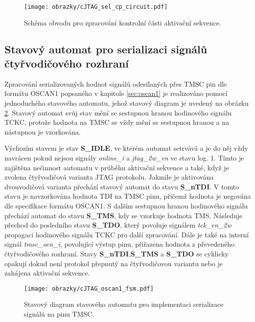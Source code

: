 \begin{figure}[!h]
  \begin{center}
    \texttt{[image: obrazky/cJTAG\_sel\_cp\_circuit.pdf]}
  \end{center}
  \caption{Schéma obvodu pro zpracování kontrolní části aktivační sekvence.}
	\label{fig:cJTAG_sel_cp_circuit}
\end{figure}

\subsection{Stavový automat pro serializaci signálů čtyřvodičového rozhraní}	\label{subsec:oscan1_fsm}
Zpracování serializovaných hodnot signálů odesílaných přes TMSC pin dle formátu OSCAN1 popsaného v kapitole \ref{sec:oscan1} je realizováno pomocí jednoduchého stavového automatu, jehož stavový diagram je uvedený na obrázku \ref{fig:cJTAG_oscan1_fsm}. Stavový automat svůj stav mění se sestupnou hranou hodinového signálu TCKC, protože hodnota na TMSC se vždy mění se sestupnou hranou a na nástupnou je vzorkována.

Výchozím stavem je stav \textbf{S\_IDLE}, ve kterém automat setrvává a je do něj vždy navrácen pokud nejsou signály \textit{online\_i} a \textit{jtag\_2w\_en} ve stavu log. 1. Tímto je zajištěna nečinnost automatu v průběhu aktivační sekvence a také, když je zvolena čtyřvodičová varianta \acs{JTAG} protokolu. Jakmile je aktivována dvouvodičová varianta přechází stavový automat do stavu \textbf{S\_nTDI}. V tomto stavu je navzorkována hodnota TDI na TMSC pinu, přičemž hodnota je negována dle specifikace formátu OSCAN1. S dalším sestupnou hranou hodinového signálu přechází automat do stavu \textbf{S\_TMS}, kdy se vzorkuje hodnota TMS. Následuje přechod do posledního stavu \textbf{S\_TDO}, který povoluje signálem \textit{tck\_en\_2w} propagaci hodinového signálu TCKC pro další zpracování. Dále je také na interní signál \textit{tmsc\_oen\_i}, povolující výstup pinu, přiřazena hodnota z převedeného čtyřvodičového rozhraní. Stavy \textbf{S\_nTDI},\textbf{S\_TMS} a \textbf{S\_TDO} se cyklicky opakují dokud není protokol přepnutý na čtyřvodičovou variantu nebo je zahájena aktivační sekvence.

\begin{figure}[!h]
  \begin{center}
    \texttt{[image: obrazky/cJTAG\_oscan1\_fsm.pdf]}
  \end{center}
  \caption{Stavový diagram stavového automatu pro implementaci serializace signálů na pinu TMSC.}
	\label{fig:cJTAG_oscan1_fsm}
\end{figure}